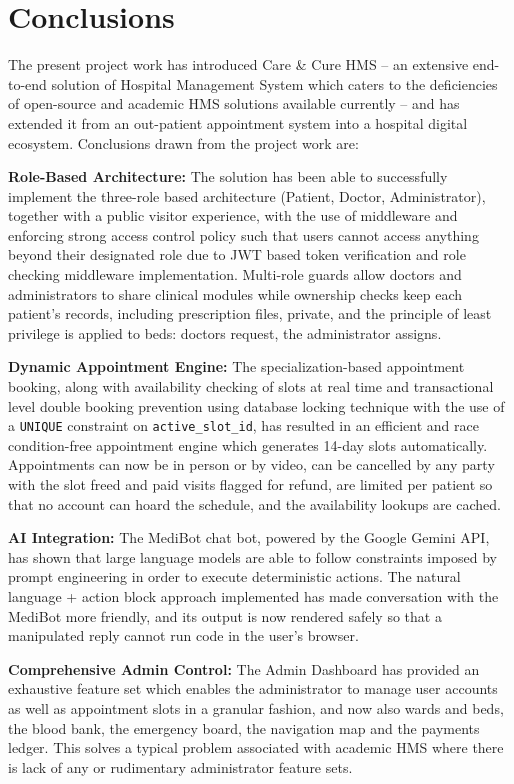 \section{Conclusions}

The present project work has introduced Care \& Cure HMS – an extensive end-to-end solution of Hospital Management System which caters to the deficiencies of open-source and academic HMS solutions available currently – and has extended it from an out-patient appointment system into a hospital digital ecosystem. Conclusions drawn from the project work are:

\textbf{Role-Based Architecture:} The solution has been able to successfully implement the three-role based architecture (Patient, Doctor, Administrator), together with a public visitor experience, with the use of middleware and enforcing strong access control policy such that users cannot access anything beyond their designated role due to JWT based token verification and role checking middleware implementation. Multi-role guards allow doctors and administrators to share clinical modules while ownership checks keep each patient's records, including prescription files, private, and the principle of least privilege is applied to beds: doctors request, the administrator assigns.

\textbf{Dynamic Appointment Engine:} The specialization-based appointment booking, along with availability checking of slots at real time and transactional level double booking prevention using database locking technique with the use of a \texttt{UNIQUE} constraint on \texttt{active\_slot\_id}, has resulted in an efficient and race condition-free appointment engine which generates 14-day slots automatically. Appointments can now be in person or by video, can be cancelled by any party with the slot freed and paid visits flagged for refund, are limited per patient so that no account can hoard the schedule, and the availability lookups are cached.

\textbf{AI Integration:} The MediBot chat bot, powered by the Google Gemini API, has shown that large language models are able to follow constraints imposed by prompt engineering in order to execute deterministic actions. The natural language + action block approach implemented has made conversation with the MediBot more friendly, and its output is now rendered safely so that a manipulated reply cannot run code in the user's browser.

\textbf{Comprehensive Admin Control:} The Admin Dashboard has provided an exhaustive feature set which enables the administrator to manage user accounts as well as appointment slots in a granular fashion, and now also wards and beds, the blood bank, the emergency board, the navigation map and the payments ledger. This solves a typical problem associated with academic HMS where there is lack of any or rudimentary administrator feature sets.

